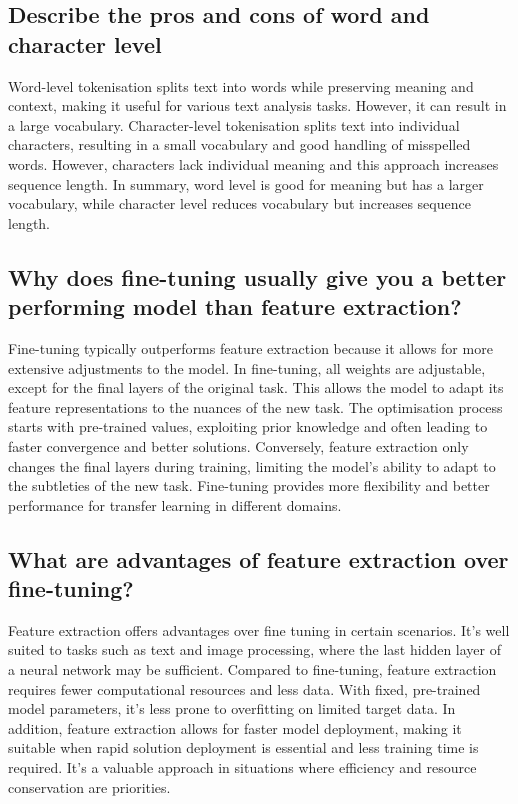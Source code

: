 \documentclass{article}
\begin{document}
\subsection{Describe the pros and cons of word and character level}

Word-level tokenisation splits text into words while preserving meaning and context, making it useful for various text analysis tasks. However, it can result in a large vocabulary.
Character-level tokenisation splits text into individual characters, resulting in a small vocabulary and good handling of misspelled words. 
However, characters lack individual meaning and this approach increases sequence length.
In summary, word level is good for meaning but has a larger vocabulary, while character level reduces vocabulary but increases sequence length.


\subsection{Why does fine-tuning usually give you a better performing model than feature extraction?}

Fine-tuning typically outperforms feature extraction because it allows for more extensive adjustments to the model.
In fine-tuning, all weights are adjustable, except for the final layers of the original task.
This allows the model to adapt its feature representations to the nuances of the new task.
The optimisation process starts with pre-trained values, exploiting prior knowledge and often leading to faster convergence and better solutions.
Conversely, feature extraction only changes the final layers during training, limiting the model's ability to adapt to the subtleties of the new task.
Fine-tuning provides more flexibility and better performance for transfer learning in different domains.


\subsection{What are advantages of feature extraction over fine-tuning?}

Feature extraction offers advantages over fine tuning in certain scenarios.
It's well suited to tasks such as text and image processing, where the last hidden layer of a neural network may be sufficient.
Compared to fine-tuning, feature extraction requires fewer computational resources and less data.
With fixed, pre-trained model parameters, it's less prone to overfitting on limited target data.
In addition, feature extraction allows for faster model deployment, making it suitable when rapid solution deployment is essential and less training time is required.
It's a valuable approach in situations where efficiency and resource conservation are priorities.
\end{document}
